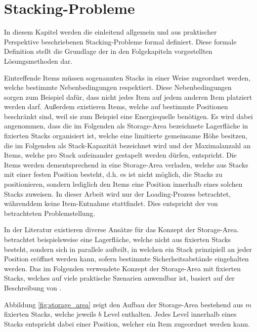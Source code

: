 \section{Stacking-Probleme}
\label{sec:stacking_problems}

In diesem Kapitel werden die einleitend allgemein und aus praktischer Perspektive beschriebenen Stacking-Probleme
formal definiert. Diese formale Definition stellt die Grundlage der in den Folgekapiteln vorgestellten Lösungsmethoden dar.

Eintreffende Items müssen sogenannten Stacks in einer Weise zugeordnet werden, welche bestimmte Nebenbedingungen respektiert.
Diese Nebenbedingungen sorgen zum Beispiel dafür, dass nicht jedes Item auf jedem anderen Item platziert werden
darf. Außerdem existieren Items, welche auf bestimmte Positionen beschränkt sind, weil sie zum Beispiel eine Energiequelle benötigen. Es wird dabei angenommen, dass die im Folgenden als Storage-Area bezeichnete Lagerfläche in fixierten
Stacks organisiert ist, welche eine limitierte gemeinsame Höhe besitzen, die im Folgenden als Stack-Kapazität bezeichnet wird
und der Maximalanzahl an Items, welche pro Stack aufeinander gestapelt werden dürfen, entspricht.
Die Items werden dementsprechend in eine Storage-Area verladen, welche aus Stacks mit einer festen Position besteht,
d.h. es ist nicht möglich, die Stacks zu positionieren, sondern lediglich den Items eine Position innerhalb eines solchen
Stacks zuweisen. In dieser Arbeit wird nur der Loading-Prozess betrachtet, währenddem keine Item-Entnahme stattfindet.
Dies entspricht der von \citet{Bruns2015} betrachteten Problemstellung.

In der Literatur existieren diverse Ansätze für das Konzept der Storage-Area.
\citet{Jaehn2013} betrachtet beispielsweise eine Lagerfläche, welche nicht aus fixierten Stacks besteht,
sondern sich in parallele 
aufteilt, in welchen ein Stack prinzipiell an jeder Position eröffnet werden kann, sofern bestimmte Sicherheitsabstände eingehalten werden.
Das im Folgenden verwendete Konzept der Storage-Area mit fixierten Stacks, welches auf viele praktische
Szenarien anwendbar ist, basiert auf der Beschreibung von \citet{Lehnfeld2014}.

Abbildung \ref{fig:storage_area} zeigt den Aufbau der Storage-Area bestehend aus $m$ fixierten
Stacks, welche jeweils $b$ Level enthalten. Jedes Level innerhalb eines Stacks entspricht dabei einer Position,
welcher ein Item zugeordnet werden kann.

